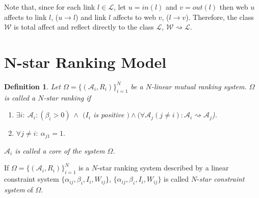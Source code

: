 \documentclass[10pt,leqno,twoside]{article}
\newtheorem{definition}{\indent Definition}[section]
\begin{document}
Note that, since for each link $l\in \mathcal{L}$, let $u=in(l)$ and $v=out(l)$ then web $u$ affects to link $l$, ($u\rightarrow l$) and link $l$ affects to web $v$, ($l\rightarrow v$). Therefore, the class $\mathcal{W}$ is total affect and reflect directly to the class $\mathcal{L}$, $\mathcal{W} \rightsquigarrow \mathcal{L}$.


\section{N-star Ranking Model}\label{Sect:N-star}

\begin{definition}
Let $\Omega = \{(\mathcal{A}_i,R_i)\}^N_{i=1}$ be a $N$-linear mutual ranking system. $\Omega$ is called a $N$-\emph{star ranking} if
\begin{enumerate}
\item $\exists i :~ \mathcal{A}_i: (\beta_i >0)~\wedge$ $(I_i$ is positive $)\wedge (\forall \mathcal{A}_j(j\neq i): \mathcal{A}_i\rightsquigarrow\mathcal{A}_j$).
\item $\forall j\neq i :~ \alpha_{j1} = 1.$
\end{enumerate}
$\mathcal{A}_i$ is called a \emph{core} of the system $\Omega$.
\end{definition}

If $\Omega = \{(\mathcal{A}_i,R_i)\}^N_{i=1}$ is a $N$-star ranking system described by a linear constraint system $\{\alpha_{ij},\beta_{i},I_i,W_{ij}\}$, $\{\alpha_{ij},\beta_{i},I_i,W_{ij}\}$ is called $N$-\emph{star constraint system} of $\Omega$.
\end{document}
